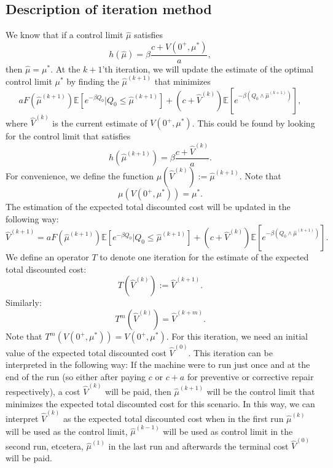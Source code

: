 \documentclass[a4paper]{thesis}
\theoremstyle{definition}
\begin{document}
\subsection{Description of iteration method}\label{section:AgeBasedIterationDescription}
We know that if a control limit $\hat{\mu}$ satisfies
\[h(\hat{\mu})=\beta\frac{c+V(0^+,\mu^*)}{a},\]
then $\hat{\mu}=\mu^*$.
At the $k+1$'th iteration, we will update the estimate of the optimal control limit $\mu^*$ by finding the $\hat{\mu}^{(k+1)}$ that minimizes
\[
aF(\hat{\mu}^{(k+1)})\mathbb{E}[e^{-\beta Q_0}|Q_0\leq \hat{\mu}^{(k+1)}]+(c+\hat{V}^{(k)})\mathbb{E}[e^{-\beta(Q_0\wedge\hat{\mu}^{(k+1)})}],
\]
where $\hat{V}^{(k)}$ is the current estimate of $V(0^+,\mu^*)$.
This could be found by looking for the control limit that satisfies
\begin{equation}\label{eq:AgeBasedIterationBound}
h(\hat{\mu}^{(k+1)})=\beta\frac{c+\hat{V}^{(k)}}{a}.\end{equation}
For convenience, we define the function $\mu(\hat{V}^{(k)}):=\hat{\mu}^{(k+1)}$.
Note that 
\begin{equation}\label{eq:AgeBasedIterationControlConvergence}
\mu(V(0^+,\mu^*))=\mu^*.
\end{equation}
The estimation of the expected total discounted cost will be updated in the following way:
\[\hat{V}^{(k+1)}=aF(\hat{\mu}^{(k+1)})\mathbb{E}[e^{-\beta Q_0}|Q_0\leq \hat{\mu}^{(k+1)}]+(c+\hat{V}^{(k)})\mathbb{E}[e^{-\beta(Q_0\wedge\hat{\mu}^{(k+1)})}].\]
We define an operator $T$ to denote one iteration for the estimate of the expected total discounted cost:
\[T(\hat{V}^{(k)}):=\hat{V}^{(k+1)}.\]
Similarly:
\[T^m(\hat{V}^{(k)})=\hat{V}^{(k+m)}.\]
Note that $T^m(V(0^+,\mu^*))=V(0^+,\mu^*)$.
For this iteration, we need an initial value of the expected total discounted cost $\hat{V}^{(0)}$.
This iteration can be interpreted in the following way:
If the machine were to run just once and at the end of the run (so either after paying $c$ or $c+a$ for preventive or corrective repair respectively), a cost $\hat{V}^{(k)}$ will be paid, then $\hat{\mu}^{(k+1)}$ will be the control limit that minimizes the expected total discounted cost for this scenario.
In this way, we can interpret $\hat{V}^{(k)}$ as the expected total discounted cost when in the first run $\hat{\mu}^{(k)}$ will be used as the control limit, $\hat{\mu}^{(k-1)}$ will be used as control limit in the second run, etcetera, $\hat{\mu}^{(1)}$ in the last run and afterwards the terminal cost $\hat{V}^{(0)}$ will be paid.
\end{document}
